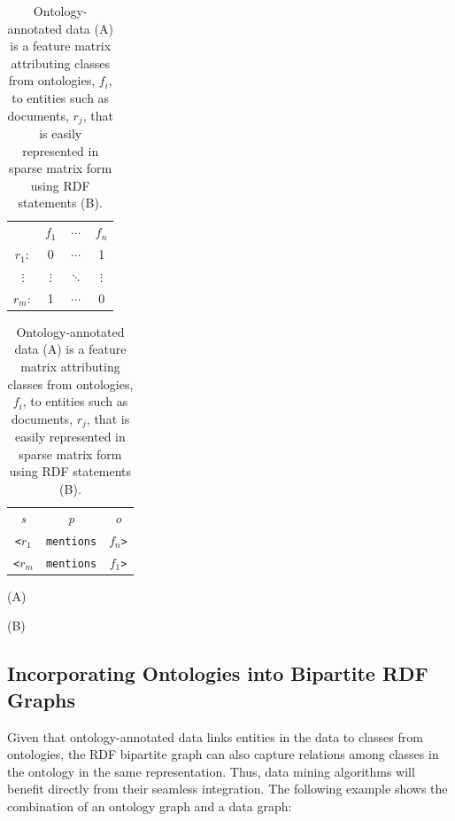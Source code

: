 \begin{table}[ht]
\begin{minipage}[b]{0.38\linewidth}\begin{flushright}
\begin{tabular}{ c | c | c | c |}
\cline{2-4}
	~   & $f_1$	    & $\cdots$  & $f_n$   \\
\cline{2-4}
$r_1:$	&  0  	& $\cdots$   &    1  \\
\cline{2-4}
$\vdots$& $\vdots$  & $\ddots$  & $\vdots$\\
\cline{2-4}
$r_m:$	&  1  	& $\cdots$   &    0  \\
\cline{2-4}
\end{tabular}
\end{flushright}
\end{minipage}
\hfill
\begin{minipage}[b]{0.4\linewidth}
\begin{tabular}{c c c}
\emph{s}&   \emph{p}&  \emph{o}\\
\texttt{<$r_1$}   &    \texttt{mentions}   &  \texttt{$f_n$>}\\
\texttt{<$r_m$}   &    \texttt{mentions}   &  \texttt{$f_1$>}\\
\end{tabular}
\end{minipage}
\begin{minipage}[c]{0.4\linewidth}\centering
\vspace{0.2cm}\hspace{2.8cm}(A)
\end{minipage}
\begin{minipage}[c]{0.4\linewidth}\centering
\vspace{0.2cm}\hspace{3.5cm}(B)
\end{minipage}
\caption{\label{tbl:binary-rel} Ontology-annotated data (A) is a feature matrix attributing classes from ontologies, $f_i$, to entities such as documents, $r_j$, that is easily represented in sparse matrix form using RDF statements (B).}
\end{table}

\subsection{Incorporating Ontologies into Bipartite RDF Graphs}
Given that ontology-annotated data links entities in the data to classes from ontologies, the RDF bipartite graph can also capture relations among classes in the ontology in the same representation. Thus, data mining algorithms will benefit directly from their seamless integration. The following example shows the combination of an ontology graph and a data graph:

